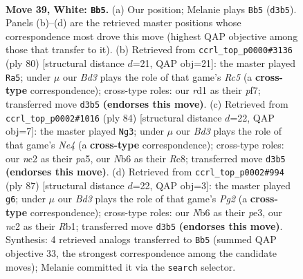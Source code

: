 \documentclass[11pt]{article}
\begin{document}
\clearpage

\begin{figure}[p]\centering
\begin{subfigure}{0.46\textwidth}\centering
\resizebox{\linewidth}{!}{%
\newchessgame
\chessboard[
  setfen={8/6k1/1N6/4p1p1/5p2/3B1P2/2n2K2/3r4 w - - 0 39},
  showmover=false,
  pgfstyle=straightmove, color=movearrow, markmove={d3-b5}
]}
\caption{}
\end{subfigure}\hfill
\begin{subfigure}{0.46\textwidth}\centering
\resizebox{\linewidth}{!}{%
\newchessgame
\chessboard[
  setfen={6k1/5p2/4p3/2Rn2p1/6P1/5K2/8/8 w - - 0 41},
  showmover=false,
  pgfstyle=straightmove, color=movearrow, markmove={c5-a5}
]}
\caption{}
\end{subfigure}
\\[4pt]
\begin{subfigure}{0.46\textwidth}\centering
\resizebox{\linewidth}{!}{%
\newchessgame
\chessboard[
  setfen={2R5/4k2p/6p1/p3p1P1/1r2N3/8/8/6K1 w - - 2 43},
  showmover=false,
  pgfstyle=straightmove, color=movearrow, markmove={e4-g3}
]}
\caption{}
\end{subfigure}\hfill
\begin{subfigure}{0.46\textwidth}\centering
\resizebox{\linewidth}{!}{%
\newchessgame
\chessboard[
  setfen={8/3R2p1/4p3/4k2p/K6P/4PP2/6P1/1r6 b - - 4 44},
  showmover=false,
  pgfstyle=straightmove, color=movearrow, markmove={g7-g6}
]}
\caption{}
\end{subfigure}
\caption{\textbf{Move 39, White: \texttt{Bb5}.} (a) Our position; Melanie plays \texttt{Bb5} (\texttt{d3b5}). Panels (b)--(d) are the retrieved master positions whose correspondence most drove this move (highest QAP objective among those that transfer to it). (b) Retrieved from \texttt{ccrl\_top\_p0000\#3136} (ply 80) [structural distance $d$=21, QAP obj=21]: the master played \texttt{Ra5}; under $\mu$ our \emph{Bd3} plays the role of that game's \emph{Rc5} (a \textbf{cross-type} correspondence); cross-type roles: our \emph{r}d1 as their \emph{p}f7; transferred move \texttt{d3b5} \textbf{(endorses this move)}. (c) Retrieved from \texttt{ccrl\_top\_p0002\#1016} (ply 84) [structural distance $d$=22, QAP obj=7]: the master played \texttt{Ng3}; under $\mu$ our \emph{Bd3} plays the role of that game's \emph{Ne4} (a \textbf{cross-type} correspondence); cross-type roles: our \emph{n}c2 as their \emph{p}a5, our \emph{N}b6 as their \emph{R}c8; transferred move \texttt{d3b5} \textbf{(endorses this move)}. (d) Retrieved from \texttt{ccrl\_top\_p0002\#994} (ply 87) [structural distance $d$=22, QAP obj=3]: the master played \texttt{g6}; under $\mu$ our \emph{Bd3} plays the role of that game's \emph{Pg2} (a \textbf{cross-type} correspondence); cross-type roles: our \emph{N}b6 as their \emph{p}e3, our \emph{n}c2 as their \emph{R}b1; transferred move \texttt{d3b5} \textbf{(endorses this move)}. Synthesis: 4 retrieved analogs transferred to \texttt{Bb5} (summed QAP objective 33, the strongest correspondence among the candidate moves); Melanie committed it via the \texttt{search} selector.}
\label{fig:thought-m76}
\end{figure}
\end{document}
